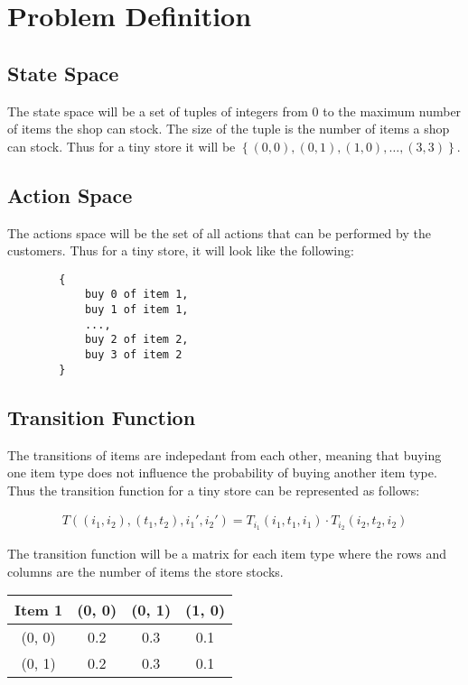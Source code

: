 \documentclass[12pt]{article}
\begin{document}
    \maketitle

    \section{Problem Definition}

    \subsection{State Space}
    The state space will be a set of tuples of integers from 0 to the maximum number of items the shop can stock. The size of the tuple is the number of items a shop can stock. 
    Thus for a tiny store it will be $\left\{(0, 0), (0, 1), (1, 0), \ldots, (3, 3)\right\}$.

    \subsection{Action Space}
    The actions space will be the set of all actions that can be performed by the customers. 
    Thus for a tiny store, it will look like the following:

    \begin{verbatim}
        {
            buy 0 of item 1,
            buy 1 of item 1,
            ...,
            buy 2 of item 2,
            buy 3 of item 2
        }
    \end{verbatim}

    \subsection{Transition Function}

    The transitions of items are indepedant from each other, meaning that buying one item type does not influence the probability of buying another item type. Thus the transition function for a tiny store can be represented as follows:

    \begin{align*}
        T((i_1, i_2), (t_1, t_2), i_1', i_2') = T_{i_1}(i_1, t_1, i_1) \cdot T_{i_2}(i_2, t_2, i_2)
    \end{align*}

    The transition function will be a matrix for each item type where the rows and columns are the number of items the store stocks.

    \begin{center}
        \begin{tabular} {|c|c|c|c|}
            \hline
            Item 1 & (0, 0) & (0, 1) & (1, 0) \\
            \hline
            (0, 0) & 0.2    & 0.3    & 0.1 \\
            (0, 1) & 0.2    & 0.3    & 0.1\\
            \hline
        \end{tabular}
    \end{center}
\end{document}
